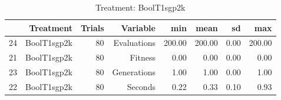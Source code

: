 \begin{table}[ht]
\centering
\begin{tabular}{rrrrrrrr}
  \hline
 & Treatment & Trials & Variable & min & mean & sd & max \\ 
  \hline
24 & BoolT1sgp2k &  80 & Evaluations & 200.00 & 200.00 & 0.00 & 200.00 \\ 
  21 & BoolT1sgp2k &  80 & Fitness & 0.00 & 0.00 & 0.00 & 0.00 \\ 
  23 & BoolT1sgp2k &  80 & Generations & 1.00 & 1.00 & 0.00 & 1.00 \\ 
  22 & BoolT1sgp2k &  80 & Seconds & 0.22 & 0.33 & 0.10 & 0.93 \\ 
   \hline
\end{tabular}
\caption{Treatment: BoolT1sgp2k} 
\end{table}
